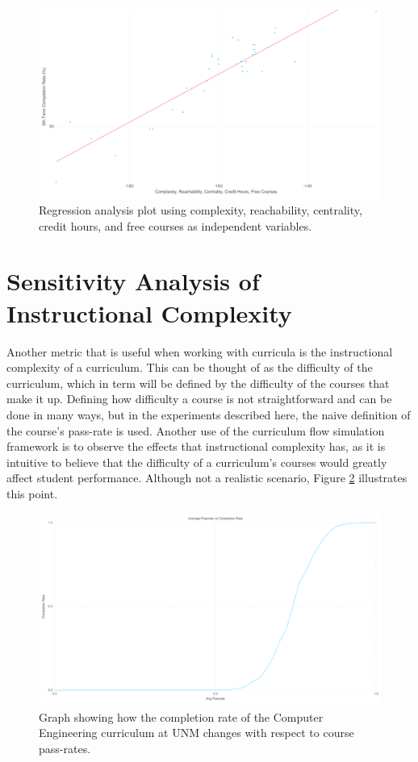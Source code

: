 \documentclass[botnum, fleqn]{unmeethesis}
\begin{document}
      \begin{figure}[h!]
        \centerline{\includegraphics[scale=0.25]{./figures/webAll.png}}
        \caption{Regression analysis plot using complexity, reachability, centrality, credit hours, and free courses as independent variables.} 
        \label{fig:webAll}
      \end{figure}


  \section{Sensitivity Analysis of Instructional Complexity}
    Another metric that is useful when working with curricula is the instructional complexity of a curriculum. This can be thought of as the difficulty of the curriculum, which in term will be defined by the difficulty of the courses that make it up. Defining how difficulty a course is not straightforward and can be done in many ways, but in the experiments described here, the naive definition of the course's pass-rate is used. Another use of the curriculum flow simulation framework is to observe the effects that instructional complexity has, as it is intuitive to believe that the difficulty of a curriculum's courses would greatly affect student performance. Although not a realistic scenario, Figure \ref{fig:instructional} illustrates this point.

    \begin{figure}[h!]
      \centerline{\includegraphics[scale=0.2]{./figures/instructional.png}}
      \caption{Graph showing how the completion rate of the Computer Engineering curriculum at UNM changes with respect to course pass-rates.} 
      \label{fig:instructional}
    \end{figure}
\end{document}
